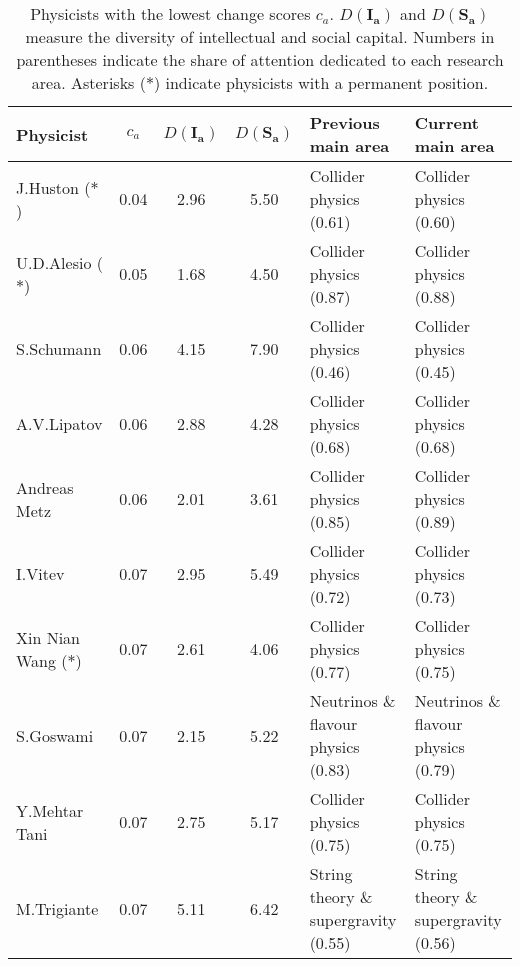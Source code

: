 \begin{table}
\centering
\caption{Physicists with the lowest change scores $c_a$. $D(\bm{I_a})$ and $D(\bm{S_a})$ measure the diversity of intellectual and social capital. Numbers in parentheses indicate the share of attention dedicated to each research area. Asterisks ($\ast$) indicate physicists with a permanent position.}
\label{table:low_change}
\begin{tabular}{p{}|c|c|c|b{}|b{}}
\toprule
             Physicist & $c_a$ & $D(\bm{I_a})$ & $D(\bm{S_a})$ &                   Previous main area &                       Current main area \\
\midrule
     J.Huston ($\ast$) &  0.04 &          2.96 &          5.50 &              Collider physics (0.61) &              Collider physics (0.60)\\ \hline
   U.D.Alesio ($\ast$) &  0.05 &          1.68 &          4.50 &              Collider physics (0.87) &              Collider physics (0.88)\\ \hline
            S.Schumann &  0.06 &          4.15 &          7.90 &              Collider physics (0.46) &              Collider physics (0.45)\\ \hline
           A.V.Lipatov &  0.06 &          2.88 &          4.28 &              Collider physics (0.68) &              Collider physics (0.68)\\ \hline
          Andreas Metz &  0.06 &          2.01 &          3.61 &              Collider physics (0.85) &              Collider physics (0.89)\\ \hline
               I.Vitev &  0.07 &          2.95 &          5.49 &              Collider physics (0.72) &              Collider physics (0.73)\\ \hline
Xin Nian Wang ($\ast$) &  0.07 &          2.61 &          4.06 &              Collider physics (0.77) &              Collider physics (0.75)\\ \hline
             S.Goswami &  0.07 &          2.15 &          5.22 &  Neutrinos \& flavour physics (0.83) &  Neutrinos \& flavour physics (0.79)\\ \hline
         Y.Mehtar Tani &  0.07 &          2.75 &          5.17 &              Collider physics (0.75) &              Collider physics (0.75)\\ \hline
           M.Trigiante &  0.07 &          5.11 &          6.42 & String theory \& supergravity (0.55) & String theory \& supergravity (0.56)\\ \hline
\bottomrule
\end{tabular}
\end{table}
